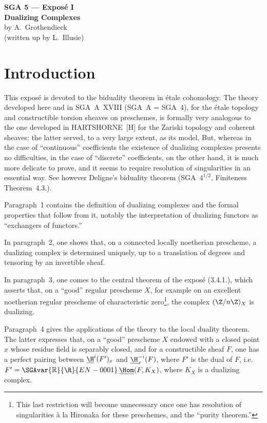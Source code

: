 \begin{center}
{\Large \textbf{SGA 5 --- Exposé I}}\\[0.4em]
{\large \textbf{Dualizing Complexes}}\\[0.3em]
by A.~Grothendieck\\
(written up by L.~Illusie)
\end{center}

\section*{Introduction}

This exposé is devoted to the biduality theorem in étale cohomology. The theory developed here and in SGA~A~XVIII (SGA~A = SGA~4), for the étale topology and constructible torsion sheaves on preschemes, is formally very analogous to the one developed in HARTSHORNE~[H] for the Zariski topology and coherent sheaves: the latter served, to a very large extent, as its model. But, whereas in the case of ``continuous'' coefficients the existence of dualizing complexes presents no difficulties, in the case of ``discrete'' coefficients, on the other hand, it is much more delicate to prove, and it seems to require resolution of singularities in an essential way. See however Deligne's biduality theorem (SGA~$4^{1/2}$, Finiteness Theorem~4.3.).

Paragraph~1 contains the definition of dualizing complexes and the formal properties that follow from it, notably the interpretation of dualizing functors as ``exchangers of functors.''

In paragraph~2, one shows that, on a connected locally noetherian prescheme, a dualizing complex is determined uniquely, up to a translation of degrees and tensoring by an invertible sheaf.

In paragraph~3, one comes to the central theorem of the exposé (3.4.1.), which asserts that, on a ``good'' regular prescheme $X$, for example on an excellent noetherian regular prescheme of characteristic zero\footnote{This last restriction will become unnecessary once one has resolution of singularities à la Hironaka for these preschemes, and the ``purity theorem.''}, the complex $(\Z/n\Z)_X$ is dualizing.

Paragraph~4 gives the applications of the theory to the local duality theorem. The latter expresses that, on a ``good'' prescheme $X$ endowed with a closed point $x$ whose residue field is separably closed, and for a constructible sheaf $F$, one has a perfect pairing between $\underline{\H}^i(F')_x$ and $\underline{\H}^{-i}_x(F)$, where $F'$ is the dual of $F$, i.e.\ $F' = \SGAvar{\mathbb{R}}{\R}{EN-0001}\,\underline{\Hom}(F,K_X)$, where $K_X$ is a dualizing complex.

